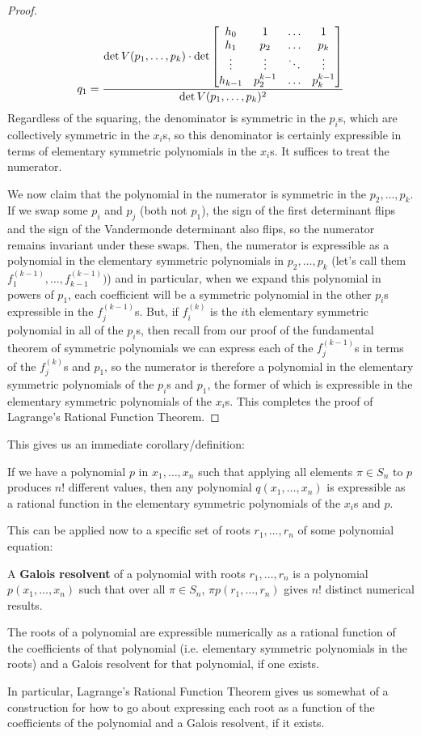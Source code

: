 \documentclass[12pt]{scrartcl}
\begin{document}
\begin{proof}
\[
    q_1 = \frac{\det V(p_1, \dots, p_k) \cdot \det \begin{bmatrix}h_0 & 1 & \dots & 1 \\
          h_1 & p_2 & \dots & p_k \\ 
          \vdots & \vdots & \ddots & \vdots \\ 
          h_{k-1} & p_2^{k-1} & \dots & p_k^{k-1}\end{bmatrix} }{\det V(p_1, \dots, p_k)^2}
\]
Regardless of the squaring, the denominator is symmetric in the $p_i$s, which are collectively symmetric in the $x_i$s, so this denominator is certainly expressible in terms of elementary symmetric polynomials in the $x_i$s. It suffices to treat the numerator. 

We now claim that the polynomial in the numerator is symmetric in the $p_2, \dots, p_k$. If we swap some $p_i$ and $p_j$ (both not $p_1$), the sign of the first determinant flips and the sign of the Vandermonde determinant also flips, so the numerator remains invariant under these swaps. Then, the numerator is expressible as a polynomial in the elementary symmetric polynomials in $p_2, \dots, p_k$ (let's call them $f_1^{(k-1)}, \dots, f_{k-1}^{(k-1)})$) and in particular, when we expand this polynomial in powers of $p_1$, each coefficient will be a symmetric polynomial in the other $p_i$s expressible in the $f_j^{(k-1)}$s. But, if $f_i^{(k)}$ is the $i$th elementary symmetric polynomial in all of the $p_i$s, then recall from our proof of the fundamental theorem of symmetric polynomials we can express each of the $f_j^{(k-1)}$s in terms of the $f_j^{(k)}$s and $p_1$, so the numerator is therefore a polynomial in the elementary symmetric polynomials of the $p_i$s and $p_1$, the former of which is expressible in the elementary symmetric polynomials of the $x_i$s. This completes the proof of Lagrange's Rational Function Theorem. 
\end{proof}

This gives us an immediate corollary/definition: 
\begin{corollary}
If we have a polynomial $p$ in $x_1, \dots, x_n$ such that applying all elements $\pi \in S_n$ to $p$ produces $n!$ different values, then any polynomial $q(x_1, \dots, x_n)$ is expressible as a rational function in the elementary symmetric polynomials of the $x_i$s and $p$.
\end{corollary}
This can be applied now to a specific set of roots $r_1, \dots, r_n$ of some polynomial equation: 
\begin{definition}
    A \textbf{Galois resolvent} of a polynomial with roots $r_1, \dots, r_n$ is a polynomial $p(x_1, \dots, x_n)$ such that over all $\pi \in S_n$, $\pi p(r_1, \dots, r_n)$ gives $n!$ distinct numerical results. 
\end{definition}
\begin{corollary}
The roots of a polynomial are expressible numerically as a rational function of the coefficients of that polynomial (i.e. elementary symmetric polynomials in the roots) and a Galois resolvent for that polynomial, if one exists. 
\end{corollary}
In particular, Lagrange's Rational Function Theorem gives us somewhat of a construction for how to go about expressing each root as a function of the coefficients of the polynomial and a Galois resolvent, if it exists. 
\end{document}
